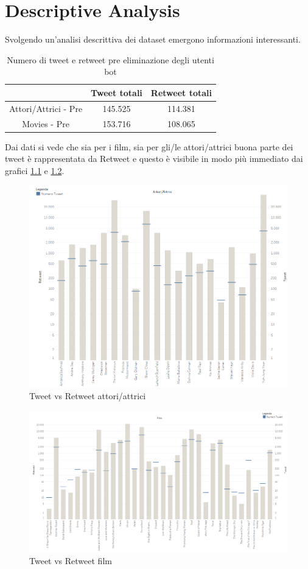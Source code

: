 \documentclass[11pt,a4paper]{report}
\begin{document}
\chapter{Descriptive Analysis}
Svolgendo un'analisi descrittiva dei dataset emergono informazioni interessanti. 

\begin{table}[h]
	\begin{center}
	\begin{tabular}{ccc}
		\toprule
		          & Tweet totali & Retweet totali \\
		\midrule
	Attori/Attrici - Pre & 145.525 & 114.381  \\
	Movies - Pre & 153.716 & 108.065 \\
	\end{tabular}
	\caption{Numero di tweet e retweet pre eliminazione degli utenti bot}
	\label{descrittiva}  
		\end{center} 
\end{table}

Dai dati si vede che sia per i film, sia per gli/le attori/attrici buona parte dei tweet è rappresentata da Retweet e questo è visibile in modo più immediato dai grafici \ref{fig:Tweet vs Retweet attori/attrici} e \ref{fig:Tweet vs Retweet film}.

	\begin{figure}[h]
			\centering
			\includegraphics[width=0.7\linewidth]{imgs/actors111.png}
			\caption{Tweet vs Retweet attori/attrici}
			\label{fig:Tweet vs Retweet attori/attrici}
		\end{figure}

	\begin{figure}[h]
			\centering
			\includegraphics[width=0.9\linewidth]{imgs/movie.png}
			\caption{Tweet vs Retweet film}
			\label{fig:Tweet vs Retweet film}
		\end{figure}
\end{document}
